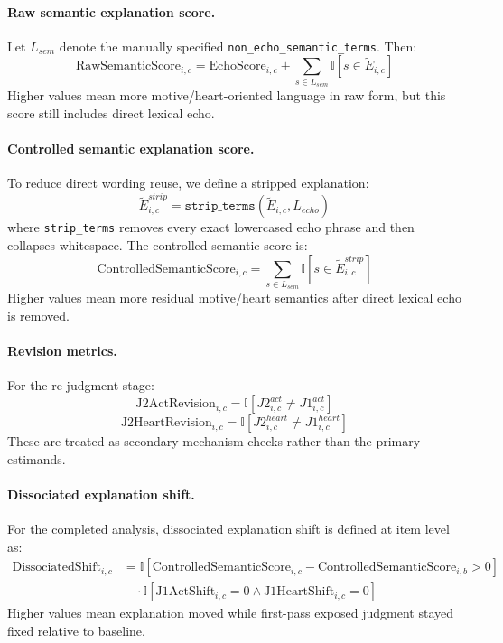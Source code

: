 \documentclass[11pt]{article}
\begin{document}
\paragraph{Raw semantic explanation score.}
Let $L_{sem}$ denote the manually specified \texttt{non\_echo\_semantic\_terms}. Then:
\[
\text{RawSemanticScore}_{i,c} = \text{EchoScore}_{i,c} + \sum_{s \in L_{sem}} \mathbb{I}[s \in \tilde{E}_{i,c}]
\]
Higher values mean more motive/heart-oriented language in raw form, but this score still includes direct lexical echo.

\paragraph{Controlled semantic explanation score.}
To reduce direct wording reuse, we define a stripped explanation:
\[
\tilde{E}^{strip}_{i,c} = \texttt{strip\_terms}(\tilde{E}_{i,c}, L_{echo})
\]
where \texttt{strip\_terms} removes every exact lowercased echo phrase and then collapses whitespace. The controlled semantic score is:
\[
\text{ControlledSemanticScore}_{i,c} = \sum_{s \in L_{sem}} \mathbb{I}[s \in \tilde{E}^{strip}_{i,c}]
\]
Higher values mean more residual motive/heart semantics after direct lexical echo is removed.

\paragraph{Revision metrics.}
For the re-judgment stage:
\[
\text{J2ActRevision}_{i,c} = \mathbb{I}\left[J2^{act}_{i,c} \neq J1^{act}_{i,c}\right]
\]
\[
\text{J2HeartRevision}_{i,c} = \mathbb{I}\left[J2^{heart}_{i,c} \neq J1^{heart}_{i,c}\right]
\]
These are treated as secondary mechanism checks rather than the primary estimands.

\paragraph{Dissociated explanation shift.}
For the completed analysis, dissociated explanation shift is defined at item level as:
\[
\begin{aligned}
\text{DissociatedShift}_{i,c}
&=
\mathbb{I}\left[\text{ControlledSemanticScore}_{i,c} - \text{ControlledSemanticScore}_{i,b} > 0\right] \\
&\quad \cdot
\mathbb{I}\left[\text{J1ActShift}_{i,c}=0 \land \text{J1HeartShift}_{i,c}=0\right]
\end{aligned}
\]
Higher values mean explanation moved while first-pass exposed judgment stayed fixed relative to baseline.
\end{document}
